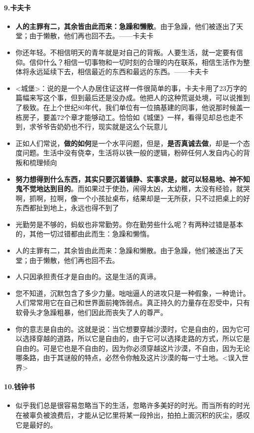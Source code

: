 \documentclass[UTF8,a4paper,8pt]{ctexbook}
\begin{document}
	\paragraph{9.卡夫卡}
	\begin{itemize}
		\item \textbf{人的主罪有二，其余皆由此而来：急躁和懒散}。由于急躁，他们被逐出了天堂；由于懒散，他们再也回不去。——卡夫卡
		
		\item 你还年轻。不相信明天的青年就是对自己的背叛。人要生活，就一定要有信仰。信仰什么？相信一切事物和一切时刻的合理的内在联系，相信生活作为整体将永远延续下去，相信最近的东西和最远的东西。——卡夫卡
		\item  <城堡>：说的是一个人办居住证这样一件很简单的事，卡夫卡用了23万字的篇幅来写这个事，但到最后还是没办成。他把人的这种荒诞处境，可以说推到了极致。在上个世纪80年代，我们单位有一位搞基建的同事，他说那时候盖一栋房子，要盖72个章才能够动工。恰恰如《城堡》一样，看得见却总也走不到，求爷爷告奶奶也不行，现实就是这么个玩意儿
		\item  正如人们常说，\textbf{做的如何}是一个水平问题，但是，\textbf{是否真诚去做}，却是一个态度问题。生活中没有侥幸，生活将以铁一般的逻辑，粉碎任何人发自内心的背叛和梳理倾向
		\item  \textbf{努力想得到什么东西，其实只要沉着镇静、实事求是，就可以轻易地、神不知鬼不觉地达到目的}。而如果过于使劲，闹得太凶，太幼稚，太没有经验，就哭啊，抓啊，拉啊，像一个小孩扯桌布，结果却是一无所获，只不过把桌上的好东西都扯到地上，永远也得不到了
		\item  光勤劳是不够的，蚂蚁也非常勤劳。你在勤劳些什么呢？有两种过错是基本的，其他一切过错都由此而生：急躁和懒惰。
		\item  人的主罪有二，其余皆由此而来：急躁和懒散。由于急躁，他们被逐出了天堂；由于懒散，他们再也回不去。
		\item  人只因承担责任才是自由的。这是生活的真谛。
		\item  您不知道，沉默包含了多少力量。咄咄逼人的进攻只是一种假象，一种诡计。人们常常用它在自己和世界面前掩饰弱点。真正持久的力量存在忍受中，只有软骨头才急躁粗暴，他们因此而丧失了人的尊严。
		\item  你的意志是自由的。这就是说：当它想要穿越沙漠时，它是自由的，因为它可以选择穿越的道路，所以它是自由的，由于它可以选择走路的方式，所以它是自由的。可是它也是不自由的，因为你必须穿越这片沙漠，不自由，因为无论哪条路，由于其谜般的特点，必然令你触及这片沙漠的每一寸土地。<误入世界>
	\end{itemize}	
	
	\paragraph{10.钱钟书}
	\begin{itemize}
		\item 似乎我们总是很容易忽略当下的生活，忽略许多美好的时光。而当所有的时光在被辜负被浪费后，才能从记忆里将某一段拎出，拍拍上面沉积的灰尘，感叹它是最好的。
	\end{itemize}
	
\end{document}
